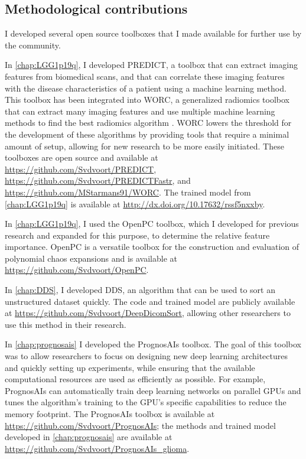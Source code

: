 \subsection{Methodological contributions}

I developed several open source toolboxes that I made available for further use by the community.

In \cref{chap:LGG1p19q}, I developed PREDICT, a toolbox that can extract imaging features from biomedical scans, and that can correlate these imaging features with the disease characteristics of a patient using a machine learning method.
This toolbox has been integrated into WORC, a generalized radiomics toolbox that can extract many imaging features and use multiple machine learning methods to find the best radiomics algorithm \autocite{mstarmans2020worc}.
WORC lowers the threshold for the development of these algorithms by providing tools that require a minimal amount of setup, allowing for new research to be more easily initiated.
These toolboxes are open source and available at \url{https://github.com/Svdvoort/PREDICT}, \url{https://github.com/Svdvoort/PREDICTFastr}, and \url{https://github.com/MStarmans91/WORC}.
The trained model from \cref{chap:LGG1p19q} is available at \url{http://dx.doi.org/10.17632/rssf5nxxby}.

In \cref{chap:LGG1p19q}, I used the OpenPC toolbox, which I developed for previous research and expanded for this purpose, to determine the relative feature importance.
OpenPC is a versatile toolbox for the construction and evaluation of polynomial chaos expansions and is available at \url{https://github.com/Svdvoort/OpenPC}.

In \cref{chap:DDS}, I developed \acrlong{DDS}, an algorithm that can be used to sort an unstructured dataset quickly.
The code and trained model are publicly available at \url{https://github.com/Svdvoort/DeepDicomSort}, allowing other researchers to use this method in their research.


In \cref{chap:prognosais} I developed the PrognosAIs toolbox.
The goal of this toolbox was to allow researchers to focus on designing new deep learning architectures and quickly setting up experiments, while ensuring that the available computational resources are used as efficiently as possible.
For example, PrognosAIs can automatically train deep learning networks on parallel GPUs and tunes the algorithm's training to the GPU's specific capabilities to reduce the memory footprint.
The PrognosAIs toolbox is available at \url{https://github.com/Svdvoort/PrognosAIs}; the methods and trained model developed in \cref{chap:prognosais} are available at \url{https://github.com/Svdvoort/PrognosAIs_glioma}.

